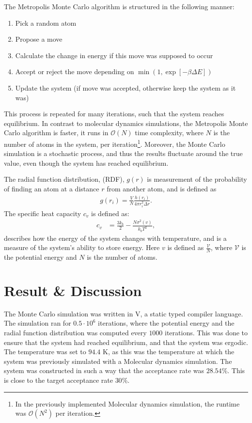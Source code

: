 \documentclass[a4paper]{article}
\newcommand{\newparagraph}{\vspace{.5cm}\noindent}
\begin{document}
\newparagraph
The Metropolis Monte Carlo algorithm is structured in the following manner:
\begin{enumerate}
    \item Pick a random atom
    \item Propose a move
    \item Calculate the change in energy if this move was supposed to occur
    \item Accept or reject the move depending on $\min\left(1, \exp\left[-\beta\Delta E\right]\right)$
    \item Update the system (if move was accepted, otherwise keep the system as it was)
\end{enumerate}This process is repeated for many iterations, such that the system reaches equilibrium.
In contrast to molecular dynamics simulations, the Metropolis Monte Carlo algorithm is faster, it runs in $\mathcal{O}(N)$ time complexity, where $N$ is the number of atoms in the system, per iteration\footnote{In the previously implemented Molecular dynamics simulation, the runtime was $\mathcal{O}(N^2)$ per iteration.}.
Moreover, the Monte Carlo simulation is a stochastic process, and thus the results fluctuate around the true value, even though the system has reached equilibrium.
\newpage

\newparagraph
The radial function distribution, (RDF), $g(r)$ is measurement of the probability of finding an atom at a distance $r$ from another atom, and is defined as
\begin{align}
    g(r_i) = \frac{V}{N}\frac{h(r_i)}{4\pi r_i^2\Delta r}.\label{eq: rdf}
\end{align}The specific heat capacity $c_v$ is defined as:
\begin{align}
    c_v &= \frac{3k_b}{2} - \frac{N\sigma^2(v)}{k_bT^2},\label{eq: specific heat}
\end{align}describes how the energy of the system changes with temperature, and is a measure of the system's ability to store energy. Here $v$ is defined as $\frac{\mathcal{V}}{N}$, where $\mathcal{V}$ is the potential energy and $N$ is the number of atoms.


\section*{Result \& Discussion}
The Monte Carlo simulation was written in V, a static typed compiler language. The simulation ran for $0.5\cdot10^6$ iterations, where the potential energy and the radial function distribution was computed every $1000$ iterations.
This was done to ensure that the system had reached equilibrium, and that the system was ergodic. The temperature was set to $94.4$ K, as this was the temperature at which the system was previously simulated with a Molecular dynamics simulation.
The system was constructed in such a way that the acceptance rate was $28.54$\%. This is close to the target acceptance rate $30$\%.
\end{document}
